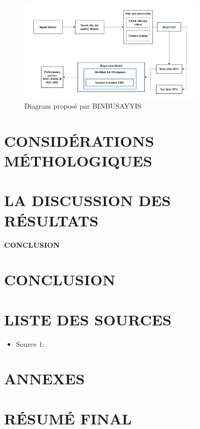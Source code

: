 \documentclass[12pt,a4paper]{report}
\begin{document}
\begin{figure}[h]
    \centering
    \includegraphics[width=0.8\textwidth]{diagram1.png}
    \caption{Diagram proposé par BINBUSAYYIS}
    \label{fig:Diagram}
\end{figure}

\chapter{CONSIDÉRATIONS MÉTHOLOGIQUES}
\lipsum[1-2]

\chapter{LA DISCUSSION DES RÉSULTATS}
\lipsum[3-4]

\newpage
\thispagestyle{empty}
\begin{center}
\vspace*{\fill}
{\Huge\textbf{CONCLUSION}}
\vspace*{\fill}
\end{center}

\chapter{CONCLUSION}
\lipsum[5-6]

\newpage
{}
{}
\chapter*{LISTE DES SOURCES}
\begin{itemize}
    \item Source 1: \cite{source1}
\end{itemize}

\newpage
{}
{}
\printindex

\newpage
{}
{}



\appendix
\chapter*{ANNEXES}
\lipsum[8]

\newpage
\thispagestyle{empty}
\mbox{}

\newpage
{}
{}
\chapter*{RÉSUMÉ FINAL}
\lipsum[11]
\end{document}
